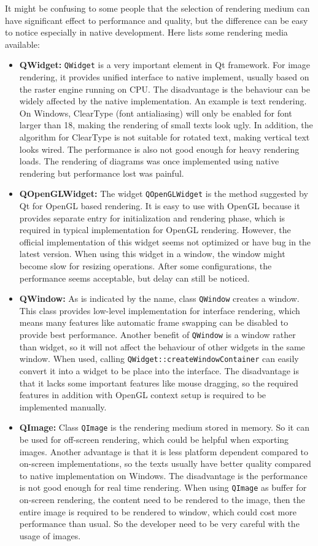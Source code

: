 It might be confusing to some people that the selection of rendering medium can have significant effect to performance and quality, but the difference can be easy to notice especially in native development. Here lists some rendering media available:

\begin{itemize}
	\item \textbf{QWidget:} \lstinline{QWidget} is a very important element in Qt framework. For image rendering, it provides unified interface to native implement, usually based on the raster engine running on CPU. The disadvantage is the behaviour can be widely affected by the native implementation. An example is text rendering. On Windows, ClearType (font antialiasing) will only be enabled for font larger than 18, making the rendering of small texts look ugly. In addition, the algorithm for ClearType is not suitable for rotated text, making vertical text looks wired. The performance is also not good enough for heavy rendering loads. The rendering of diagrams was once implemented using native rendering but performance lost was painful.
	\item \textbf{QOpenGLWidget:} The widget \lstinline{QOpenGLWidget} is the method suggested by Qt for OpenGL based rendering. It is easy to use with OpenGL because it provides separate entry for initialization and rendering phase, which is required in typical implementation for OpenGL rendering. However, the official implementation of this widget seems not optimized or have bug in the latest version. When using this widget in a window, the window might become slow for resizing operations. After some configurations, the performance seems acceptable, but delay can still be noticed.
	\item \textbf{QWindow:} As is indicated by the name, class \lstinline{QWindow} creates a window. This class provides low-level implementation for interface rendering, which means many features like automatic frame swapping can be disabled to provide best performance. Another benefit of \lstinline{QWindow} is a window rather than widget, so it will not affect the behaviour of other widgets in the same window. When used, calling \lstinline{QWidget::createWindowContainer} can easily convert it into a widget to be place into the interface. The disadvantage is that it lacks some important features like mouse dragging, so the required features in addition with OpenGL context setup is required to be implemented manually.
	\item \textbf{QImage:} Class \lstinline{QImage} is the rendering medium stored in memory. So it can be used for off-screen rendering, which could be helpful when exporting images. Another advantage is that it is less platform dependent compared to on-screen implementations, so the texts usually have better quality compared to native implementation on Windows. The disadvantage is the performance is not good enough for real time rendering. When using \lstinline{QImage} as buffer for on-screen rendering, the content need to be rendered to the image, then the entire image is required to be rendered to window, which could cost more performance than usual. So the developer need to be very careful with the usage of images.

\end{itemize}
